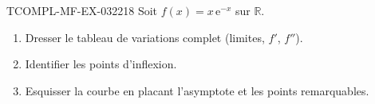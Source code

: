 \begin{exercice}{TCOMPL-MF-EX-032}{2}{18}
Soit $f(x) = x\,\mathrm{e}^{-x}$ sur $\mathbb{R}$.
\begin{enumerate}
  \item Dresser le tableau de variations complet (limites, $f'$, $f''$).
  \item Identifier les points d'inflexion.
  \item Esquisser la courbe en placant l'asymptote et les points remarquables.
\end{enumerate}

\end{exercice}
